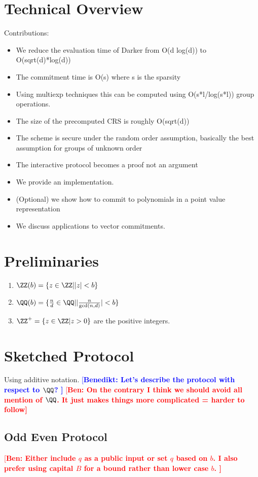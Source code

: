 \documentclass[12pt]{article}
\theoremstyle{Definition}
\newcommand{\ben}[1]{{\textcolor{red}{[\bf Ben: #1]}}}
\newcommand{\benedikt}[1]{{\textcolor{blue}{[\bf Benedikt: #1]}}}
\newcommand{\ben}[1]{}
\begin{document}
\section{Technical Overview}
Contributions:
\begin{itemize}
	\item We reduce the evaluation time of Darker from O(d log(d)) to O(sqrt(d)*log(d))
	\item The commitment time is O(s) where s is the sparsity 
	\item Using multiexp techniques this can be computed using O(s*l/log(s*l)) group operations. 
	\item The size of the precomputed CRS is roughly O(sqrt(d))
	\item The scheme is secure under the random order assumption, basically the best assumption for groups of unknown order
	\item The interactive protocol becomes a proof not an argument
	\item We provide an implementation.
	\item (Optional) we show how to commit to polynomials in a point value representation
	\item We discuss applications to vector commitments. 
\end{itemize}

\section{Preliminaries}
\begin{enumerate}
	\item $\ZZ(b)=\{ z \in \ZZ | |z|<b\}$
	\item $\QQ(b)=\{\frac{n}{d} \in \QQ | |\frac{n}{\gcd(n,d)}|< b\}$
	\item $\ZZ^+=\{z \in \ZZ | z>0\}$ are the positive integers.
	\end{enumerate}
\section{Sketched Protocol}
Using additive notation. 
\benedikt{Let's describe the protocol with respect to $\QQ$? }
\ben{On the contrary I think we should avoid all mention of $\QQ$. It just makes things more complicated = harder to follow} 

\subsection{Odd Even Protocol}
\ben{Either include $q$ as a public input or set $q$ based on $b$. I also prefer using capital $B$ for a bound rather than lower case $b$. } 
\end{document}
